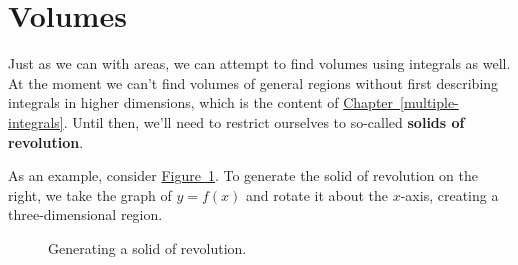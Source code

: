 \documentclass[10pt,]{book}
\newcommand{\terminology}[1]{\textbf{#1}}
\theoremstyle{ptxplainnotitle}
\theoremstyle{ptxplaintitle}
\theoremstyle{ptxplainnotitle}
\theoremstyle{ptxplaintitle}
\theoremstyle{ptxplainnotitle}
\theoremstyle{ptxplaintitle}
\theoremstyle{ptxdefinitionnotitle}
\theoremstyle{ptxdefinitiontitle}
\theoremstyle{ptxdefinitionnotitle}
\theoremstyle{ptxdefinitiontitle}
\theoremstyle{ptxdefinitionnotitle}
\theoremstyle{ptxdefinitiontitle}
\theoremstyle{ptxdefinitionnotitle}
\theoremstyle{ptxdefinitiontitle}
\theoremstyle{ptxdefinitionnotitle}
\theoremstyle{ptxdefinitiontitle}
\numberwithin{equation}{section}
\begin{document}
\section[{Volumes}]{Volumes}\label{section-volumes}
\hypertarget{p-627}{}%
Just as we can with areas, we can attempt to find volumes using integrals as well. At the moment we can't find volumes of general regions without first describing integrals in higher dimensions, which is the content of \hyperref[multiple-integrals]{Chapter~\ref{multiple-integrals}}. Until then, we'll need to restrict ourselves to so-called \terminology{solids of revolution}.%
\par
\hypertarget{p-628}{}%
As an example, consider \hyperref[figure-solid-revolution-1]{Figure~\ref{figure-solid-revolution-1}}. To generate the solid of revolution on the right, we take the graph of \(y = f(x)\) and rotate it about the \(x\)-axis, creating a three-dimensional region.%
\begin{figure}
\centering
\begin{sidebyside}{2}{0}{0}{0}
\begin{sbspanel}{0.5}
\end{sbspanel}
\begin{sbspanel}{0.5}
\end{sbspanel}
\end{sidebyside}
\caption{Generating a solid of revolution.\label{figure-solid-revolution-1}}
\end{figure}
\end{document}
